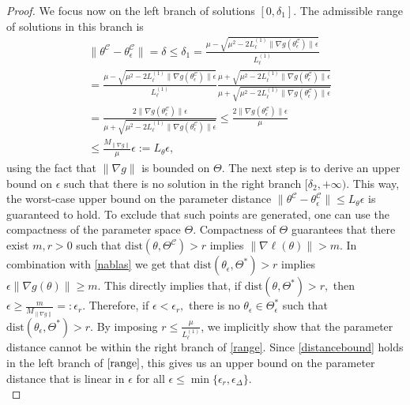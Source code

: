 \documentclass[letterpaper, 10 pt]{IEEEtran}  %
\newcommand{\dist}{\mathrm{dist}}
\begin{document}
\begin{proof}
   We focus now on the left branch of solutions $[0, \delta_1]$. 
   The admissible range of solutions in this branch is 
   \begin{align}
      &\|\theta^\mathcal{C} - \theta^\mathcal{C}_\epsilon\|= \delta \le \delta_1 = \frac{\mu - \sqrt{\mu^2 - 2 L_\ell^{(1)} \|\nabla g(\theta^\mathcal{C}_\epsilon)\|\epsilon }}{L_\ell^{(1)}} \\
      &=  \frac{\mu - \sqrt{\mu^2 - 2 L_\ell^{(1)} \|\nabla g(\theta^\mathcal{C}_\epsilon)\|\epsilon }}{L_\ell^{(1)}}
      \frac{{\mu + \sqrt{\mu^2 - 2 L_\ell^{(1)} \|\nabla g(\theta^\mathcal{C}_\epsilon)\|\epsilon }}}{{\mu + \sqrt{\mu^2 - 2 L_\ell^{(1)} \|\nabla g(\theta^\mathcal{C}_\epsilon)\|\epsilon}}} \\
      &= \frac{2\|\nabla g(\theta^\mathcal{C}_\epsilon)\|\epsilon}{{\mu + \sqrt{\mu^2 - 2 L_\ell^{(1)} \|\nabla g(\theta^\mathcal{C}_\epsilon)\|\epsilon}}}
      \le \frac{2\|\nabla g(\theta^\mathcal{C}_\epsilon)\|\epsilon}{{\mu}}\\ &\le \frac{M_{\|\nabla g\|}}{{\mu}}\epsilon :=L_\theta \epsilon,  \label{distancebound}
   \end{align}
   using the fact that $\|\nabla g\|$ is bounded on $\Theta$.
   The next step is to derive an upper bound on $\epsilon$ such that there is no solution in the right branch $[\delta_2, +\infty)$. 
   This way,  the worst-case upper bound on the parameter distance $\|\theta^\mathcal{C} - \theta^\mathcal{C}_\epsilon\| \le L_\theta \epsilon$ is guaranteed to hold.
   To exclude that such points are generated, one can use the compactness of the parameter space $\Theta$. 
   Compactness of $\Theta$ guarantees that there exist $m, r>0$ such that $\dist(\theta, \Theta^\mathcal{C})>r$ implies $\|\nabla \ell(\theta)\|> m$. 
   In combination with \eqref{nablas} we get that $\dist(\theta_\epsilon, \Theta^*)>r$ implies $\epsilon\|\nabla g(\theta)\|\ge m$. 
   This directly implies that, if $\dist(\theta, \Theta^*)>r,$ then $\epsilon \ge \frac{m}{M_{\|\nabla g\|}}=: \epsilon_r$. 
   Therefore, if $\epsilon<\epsilon_r,$ there is no  $\theta_\epsilon \in \Theta^*_\epsilon$ such that $\dist(\theta_\epsilon, \Theta^*)>r$. 
   By imposing $r \le \frac{\mu}{L_\ell^{(1)}}$, we implicitly show that the parameter distance cannot be within the right branch of \eqref{range}.
   Since \eqref{distancebound} holds in the left branch of $\eqref{range}$, this gives us an upper bound on the parameter distance that is linear in $\epsilon$ for all $\epsilon \le \min\{\epsilon_r,\epsilon_\Delta\}$.
   \\


\end{proof}
\end{document}
